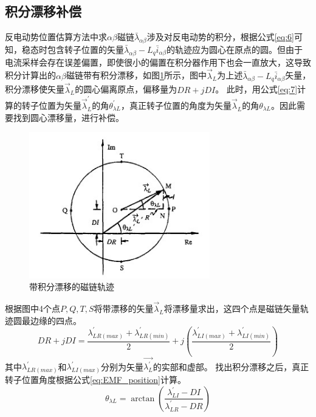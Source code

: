 \subsection{积分漂移补偿}
反电动势位置估算方法中求$\alpha\beta$磁链$\bar{\lambda}_{\alpha\beta}$涉及对反电动势的积分，根据公式\ref{eq:6}可知，稳态时包含转子位置的矢量$\bar{\lambda}_{\alpha\beta}-L_{q}\bar{i}_{\alpha\beta}$的轨迹应为圆心在原点的圆。但由于电流采样会存在误差偏置，即使很小的偏置在积分器作用下也会一直放大，这导致积分计算出的$\alpha\beta$磁链带有积分漂移，如图\ref{fig:dc_removal}所示，图中$\overrightarrow{\lambda}_{L}$为上述$\bar{\lambda}_{\alpha\beta}-L_{q}\bar{i}_{\alpha\beta}$矢量，积分漂移使矢量$\overrightarrow{\lambda}_{L}$的圆心偏离原点，偏移量为$DR+jDI$。
此时，用公式\ref{eq:7}计算的转子位置为矢量$\overrightarrow{\lambda}_{L}^{\prime}$的角$\theta_{\lambda L}^{\prime}$，真正转子位置的角度为矢量$\overrightarrow{\lambda}_{L}$的角$\theta_{\lambda L}$。因此需要找到圆心漂移量，进行补偿。
\begin{figure}[H]
	\centering
	\includegraphics[width=0.7\textwidth]{figs/dc_removal.jpg}
	\caption{带积分漂移的磁链轨迹}
	\label{fig:dc_removal}
\end{figure}
根据图中4个点$P,Q,T,S$将带漂移的矢量$\overrightarrow{\lambda}_{L}$将漂移量求出，这四个点是磁链矢量轨迹圆最边缘的四点。
\begin{equation}
DR+jDI=\frac{\lambda_{LR(max)}^{\prime}+\lambda_{LR(min)}^{\prime}}{2}+j\left(\frac{\lambda_{LI(max)}^{\prime}+\lambda_{LI(min)}^{\prime}}{2} \right)
\end{equation}
其中$\lambda_{LR(max)}^{\prime}$和$\lambda_{LI(max)}^{\prime}$分别为矢量$\overrightarrow{\lambda_{L}^{\prime}}$的实部和虚部。
找出积分漂移之后，真正转子位置角度根据公式\ref{eq:EMF_position}计算。
\begin{equation}\label{eq:EMF_position}
\theta_{\lambda L}=\arctan{\left(\frac{\lambda_{LI}^{\prime}-DI}{\lambda_{LR}^{\prime}-DR}\right)}
\end{equation}
